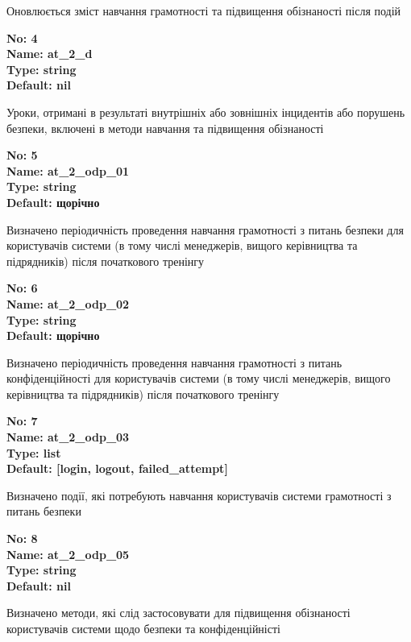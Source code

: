 \documentclass{article}
\begin{document}
{\footnotesize Оновлюється зміст навчання грамотності та підвищення обізнаності після подій}


{\footnotesize\bfseries
No: 4\\
Name: at\_\allowbreak{}2\_\allowbreak{}d\\
Type: string\\
Default: nil
}

{\footnotesize Уроки, отримані в результаті внутрішніх або зовнішніх інцидентів або порушень безпеки, включені в методи навчання та підвищення обізнаності}


{\footnotesize\bfseries
No: 5\\
Name: at\_\allowbreak{}2\_\allowbreak{}odp\_\allowbreak{}01\\
Type: string\\
Default: \textquotedbl{}щорічно\textquotedbl{}
}

{\footnotesize Визначено періодичність проведення навчання грамотності з питань безпеки для користувачів системи (в тому числі менеджерів, вищого керівництва та підрядників) після початкового тренінгу}


{\footnotesize\bfseries
No: 6\\
Name: at\_\allowbreak{}2\_\allowbreak{}odp\_\allowbreak{}02\\
Type: string\\
Default: \textquotedbl{}щорічно\textquotedbl{}
}

{\footnotesize Визначено періодичність проведення навчання грамотності з питань конфіденційності для користувачів системи (в тому числі менеджерів, вищого керівництва та підрядників) після початкового тренінгу}


{\footnotesize\bfseries
No: 7\\
Name: at\_\allowbreak{}2\_\allowbreak{}odp\_\allowbreak{}03\\
Type: list\\
Default: [\textquotedbl{}login\textquotedbl{}, \textquotedbl{}logout\textquotedbl{}, \textquotedbl{}failed\_\allowbreak{}attempt\textquotedbl{}]
}

{\footnotesize Визначено події, які потребують навчання користувачів системи грамотності з питань безпеки}


{\footnotesize\bfseries
No: 8\\
Name: at\_\allowbreak{}2\_\allowbreak{}odp\_\allowbreak{}05\\
Type: string\\
Default: nil
}

{\footnotesize Визначено методи, які слід застосовувати для підвищення обізнаності користувачів системи щодо безпеки та конфіденційністі}
\end{document}
